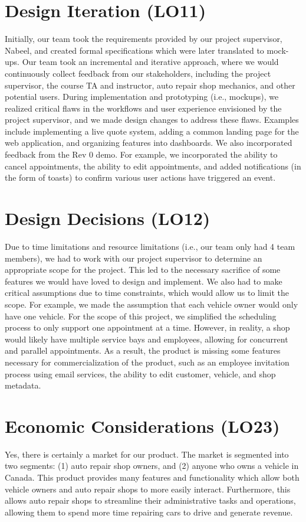 \documentclass{article}
\begin{document}
\section{Design Iteration (LO11)}
Initially, our team took the requirements provided by our project supervisor, Nabeel, and created
formal specifications which were later translated to mock-ups. Our team took an incremental and
iterative approach, where we would continuously collect feedback from our stakeholders, including
the project supervisor, the course TA and instructor, auto repair shop mechanics, and other
potential users. During implementation and prototyping (i.e., mockups), we realized critical flaws
in the workflows and user experience envisioned by the project supervisor, and we made design
changes to address these flaws. Examples include implementing a live quote system, adding a common
landing page for the web application, and organizing features into dashboards. We also incorporated
feedback from the Rev 0 demo. For example, we incorporated the ability to cancel appointments, the
ability to edit appointments, and added notifications (in the form of toasts) to confirm various
user actions have triggered an event.

\section{Design Decisions (LO12)}
Due to time limitations and resource limitations (i.e., our team only had 4 team members), we had
to work with our project supervisor to determine an appropriate scope for the project. This led to
the necessary sacrifice of some features we would have loved to design and implement. We also had
to make critical assumptions due to time constraints, which would allow us to limit the scope. For
example, we made the assumption that each vehicle owner would only have one vehicle. For the scope
of this project, we simplified the scheduling process to only support one appointment at a time.
However, in reality, a shop would likely have multiple service bays and employees, allowing for
concurrent and parallel appointments. As a result, the product is missing some features necessary
for commercialization of the product, such as an employee invitation process using email services,
the ability to edit customer, vehicle, and shop metadata.

\section{Economic Considerations (LO23)}
Yes, there is certainly a market for our product. The market is segmented into two segments: (1)
auto repair shop owners, and (2) anyone who owns a vehicle in Canada. This product provides many
features and functionality which allow both vehicle owners and auto repair shops to more easily
interact. Furthermore, this allows auto repair shops to streamline their administrative tasks and
operations, allowing them to spend more time repairing cars to drive and generate revenue.
\end{document}
